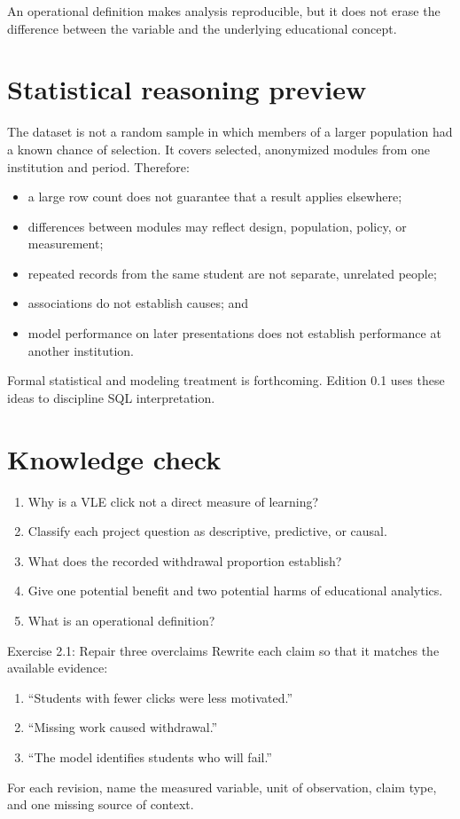An operational definition makes analysis reproducible, but it does not erase
the difference between the variable and the underlying educational concept.

\section{Statistical reasoning preview}

The dataset is not a random sample in which members of a larger population had
a known chance of selection. It covers selected, anonymized modules from one
institution and period. Therefore:

\begin{itemize}
  \item a large row count does not guarantee that a result applies elsewhere;
  \item differences between modules may reflect design, population, policy, or
    measurement;
  \item repeated records from the same student are not separate, unrelated
    people;
  \item associations do not establish causes; and
  \item model performance on later presentations does not establish performance
    at another institution.
\end{itemize}

Formal statistical and modeling treatment is forthcoming. Edition 0.1 uses
these ideas to discipline SQL interpretation.

\section{Knowledge check}

\begin{enumerate}
  \item Why is a VLE click not a direct measure of learning?
  \item Classify each project question as descriptive, predictive, or causal.
  \item What does the recorded withdrawal proportion establish?
  \item Give one potential benefit and two potential harms of educational
    analytics.
  \item What is an operational definition?
\end{enumerate}

\begin{exercisebox}{Exercise 2.1: Repair three overclaims}
Rewrite each claim so that it matches the available evidence:
\begin{enumerate}
  \item ``Students with fewer clicks were less motivated.''
  \item ``Missing work caused withdrawal.''
  \item ``The model identifies students who will fail.''
\end{enumerate}
For each revision, name the measured variable, unit of observation, claim type,
and one missing source of context.
\end{exercisebox}

